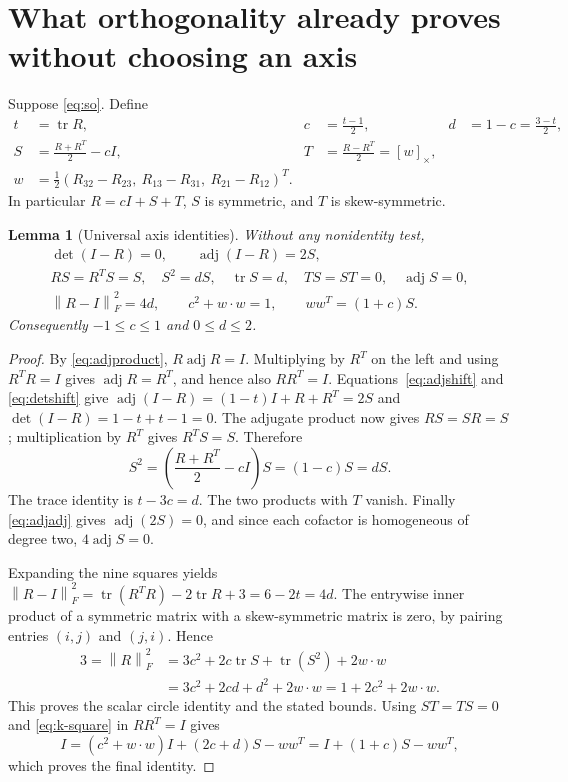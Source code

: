 \documentclass[11pt]{article}
\newtheorem{lemma}[theorem]{Lemma}
\theoremstyle{definition}\newtheorem{definition}[theorem]{Definition}
\newcommand{\tr}{\operatorname{tr}}\newcommand{\adj}{\operatorname{adj}}
\newcommand{\norm}[1]{\left\lVert#1\right\rVert}
\newcommand{\crossmat}[1]{[#1]_{\times}}
\begin{document}
\section{What orthogonality already proves without choosing an axis}
\label{sec:universal}
Suppose \eqref{eq:so}. Define
\begin{equation}\label{eq:definitions}
\begin{aligned}
 t&=\tr R,&c&=\frac{t-1}{2},&d&=1-c=\frac{3-t}{2},\\
 S&=\frac{R+R^T}{2}-cI,&T&=\frac{R-R^T}{2}=\crossmat w,\\
 w&=\frac12(R_{32}-R_{23},\ R_{13}-R_{31},\ R_{21}-R_{12})^T.
\end{aligned}
\end{equation}
In particular $R=cI+S+T$, $S$ is symmetric, and $T$ is skew-symmetric.

\begin{lemma}[Universal axis identities]\label{lem:universal}
Without any nonidentity test,
\begin{gather}
 \det(I-R)=0,\qquad \adj(I-R)=2S,\label{eq:axis-adj}\\
 RS=R^TS=S,\quad S^2=dS,\quad\tr S=d,\quad TS=ST=0,\quad\adj S=0,
 \label{eq:s-identities}\\
 \norm{R-I}_F^2=4d,\qquad c^2+w\cdot w=1,\qquad ww^T=(1+c)S.
 \label{eq:scalar-identities}
\end{gather}
Consequently $-1\le c\le1$ and $0\le d\le2$.
\end{lemma}
\begin{proof}
By \eqref{eq:adjproduct}, $R\adj R=I$. Multiplying by $R^T$ on the left
and using $R^TR=I$ gives $\adj R=R^T$, and hence also $RR^T=I$.
Equations~\eqref{eq:adjshift} and \eqref{eq:detshift} give
$\adj(I-R)=(1-t)I+R+R^T=2S$ and
$\det(I-R)=1-t+t-1=0$.
The adjugate product now gives $RS=SR=S$; multiplication by $R^T$
gives $R^TS=S$. Therefore
\[
 S^2=\left(\frac{R+R^T}{2}-cI\right)S=(1-c)S=dS.
\]
The trace identity is $t-3c=d$. The two products with $T$ vanish.
Finally \eqref{eq:adjadj} gives $\adj(2S)=0$, and since each cofactor
is homogeneous of degree two, $4\adj S=0$.

Expanding the nine squares yields
$\norm{R-I}_F^2=\tr(R^TR)-2\tr R+3=6-2t=4d$.
The entrywise inner product of a symmetric matrix with a skew-symmetric
matrix is zero, by pairing entries $(i,j)$ and $(j,i)$. Hence
\begin{align*}
 3=\norm R_F^2
 &=3c^2+2c\tr S+\tr(S^2)+2w\cdot w\\
 &=3c^2+2cd+d^2+2w\cdot w
 =1+2c^2+2w\cdot w.
\end{align*}
This proves the scalar circle identity and the stated bounds.
Using $ST=TS=0$ and \eqref{eq:k-square} in $RR^T=I$ gives
\[
 I=(c^2+w\cdot w)I+(2c+d)S-ww^T
   =I+(1+c)S-ww^T,
\]
which proves the final identity.
\end{proof}
\end{document}
